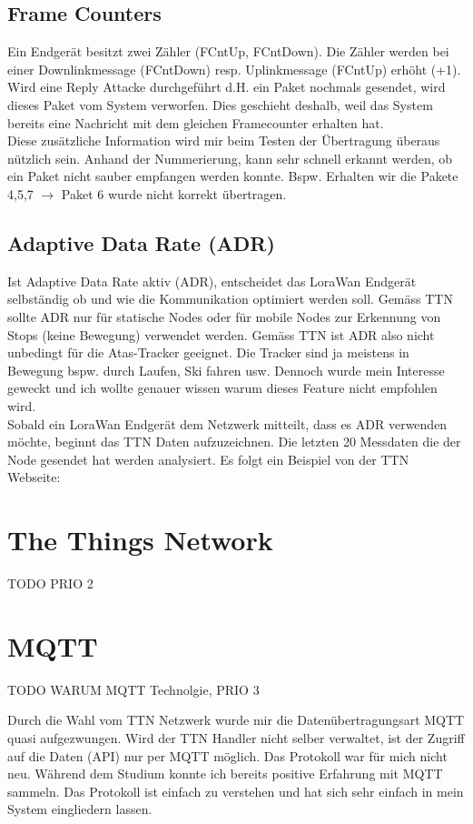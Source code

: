 \documentclass[11pt,english,german]{report}
\theoremstyle{definition}
\begin{document}
\subsection{Frame Counters}
Ein Endgerät besitzt zwei Zähler (FCntUp, FCntDown). Die Zähler werden bei einer Downlinkmessage (FCntDown) resp. Uplinkmessage (FCntUp) erhöht (+1).\\[0.3cm]
Wird eine Reply Attacke durchgeführt d.H. ein Paket nochmals gesendet, wird dieses Paket vom System verworfen. Dies geschieht deshalb, weil das System bereits eine Nachricht mit dem gleichen Framecounter erhalten hat.\\[0.3cm]
Diese zusätzliche Information wird mir beim Testen der Übertragung überaus nützlich sein. Anhand der Nummerierung, kann sehr schnell erkannt werden, ob ein Paket nicht sauber empfangen werden konnte. Bspw. Erhalten wir die Pakete 4,5,7 $\rightarrow$ Paket 6 wurde nicht korrekt übertragen.

\subsection{Adaptive Data Rate (ADR)}
Ist Adaptive Data Rate aktiv (ADR), entscheidet das LoraWan Endgerät selbständig ob und wie die Kommunikation optimiert werden soll. Gemäss TTN \cite{ADRTTN} sollte ADR nur für statische Nodes oder für mobile Nodes zur Erkennung von Stops (keine Bewegung) verwendet werden. Gemäss TTN ist ADR also nicht unbedingt für die Atas-Tracker geeignet. Die Tracker sind ja meistens in Bewegung bspw. durch Laufen, Ski fahren usw. Dennoch wurde mein Interesse geweckt und ich wollte genauer wissen warum dieses Feature nicht empfohlen wird.\\[0.3cm]
Sobald ein LoraWan Endgerät dem Netzwerk mitteilt, dass es ADR verwenden möchte, beginnt das TTN Daten aufzuzeichnen. Die letzten 20 Messdaten die der Node gesendet hat werden analysiert. Es folgt ein Beispiel von der TTN Webseite:

\newpage
\section{The Things Network}
TODO PRIO 2

\newpage
\section{MQTT}
TODO WARUM MQTT Technolgie, PRIO 3

Durch die Wahl vom TTN Netzwerk wurde mir die Datenübertragungsart MQTT quasi aufgezwungen. Wird der TTN Handler nicht selber verwaltet, ist der Zugriff auf die Daten (API) nur per MQTT möglich. Das Protokoll war für mich nicht neu. Während dem Studium konnte ich bereits positive Erfahrung mit MQTT sammeln. Das Protokoll ist einfach zu verstehen und hat sich sehr einfach in mein System eingliedern lassen.
\end{document}
